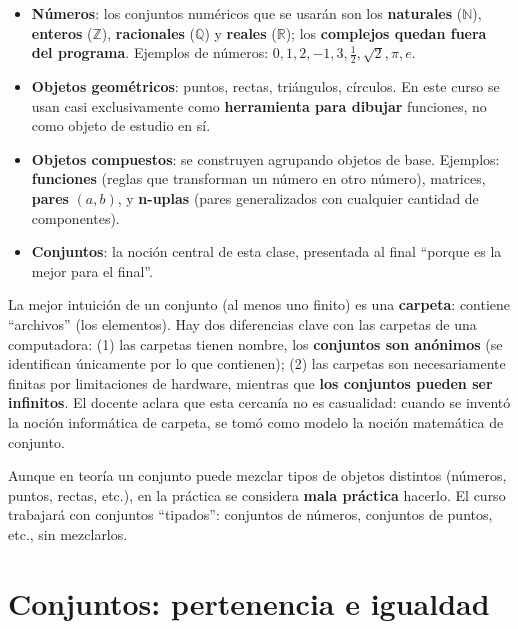 \documentclass[12pt,a4paper]{article}
\begin{document}
\begin{itemize}
  \item \textbf{Números}: los conjuntos numéricos que se usarán son los
    \textbf{naturales} ($\mathbb{N}$), \textbf{enteros} ($\mathbb{Z}$),
    \textbf{racionales} ($\mathbb{Q}$) y \textbf{reales} ($\mathbb{R}$);
    los \textbf{complejos quedan fuera del programa}. Ejemplos de números:
    $0, 1, 2, -1, 3, \tfrac{1}{2}, \sqrt{2}, \pi, e$.
  \item \textbf{Objetos geométricos}: puntos, rectas, triángulos,
    círculos. En este curso se usan casi exclusivamente como
    \textbf{herramienta para dibujar} funciones, no como objeto de estudio
    en sí.
  \item \textbf{Objetos compuestos}: se construyen agrupando objetos de
    base. Ejemplos: \textbf{funciones} (reglas que transforman un número
    en otro número), matrices, \textbf{pares} $(a,b)$, y \textbf{n-uplas}
    (pares generalizados con cualquier cantidad de componentes).
  \item \textbf{Conjuntos}: la noción central de esta clase, presentada al
    final ``porque es la mejor para el final''.
\end{itemize}

\begin{notebox}
La mejor intuición de un conjunto (al menos uno finito) es una
\textbf{carpeta}: contiene ``archivos'' (los elementos). Hay dos
diferencias clave con las carpetas de una computadora: (1) las carpetas
tienen nombre, los \textbf{conjuntos son anónimos} (se identifican
únicamente por lo que contienen); (2) las carpetas son necesariamente
finitas por limitaciones de hardware, mientras que \textbf{los conjuntos
pueden ser infinitos}. El docente aclara que esta cercanía no es
casualidad: cuando se inventó la noción informática de carpeta, se tomó
como modelo la noción matemática de conjunto.
\end{notebox}

\begin{notebox}
Aunque en teoría un conjunto puede mezclar tipos de objetos distintos
(números, puntos, rectas, etc.), en la práctica se considera \textbf{mala
práctica} hacerlo. El curso trabajará con conjuntos ``tipados'': conjuntos
de números, conjuntos de puntos, etc., sin mezclarlos.
\end{notebox}

\section{Conjuntos: pertenencia e igualdad}
\end{document}
